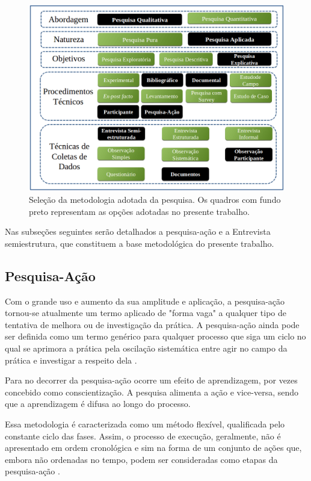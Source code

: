 \begin{figure}[!htb]
	\centering
	\includegraphics[scale=0.5]{figuras/Metodologia}
	\caption{Seleção da metodologia adotada da pesquisa. Os quadros com fundo preto representam as opções adotadas no presente trabalho.}
	\label{metodologia_adotada}
\end{figure}

Nas subseções seguintes serão detalhados a pesquisa-ação e a Entrevista semiestrutura, que constituem a base metodológica do presente trabalho.

\subsection{Pesquisa-Ação}

Com o grande uso e aumento da sua amplitude e aplicação, a pesquisa-ação tornou-se atualmente um termo aplicado de "forma vaga" a qualquer tipo de tentativa de melhora ou de investigação da prática. A pesquisa-ação ainda pode ser definida como um termo genérico para qualquer processo que siga um ciclo no qual se aprimora a prática pela oscilação sistemática entre agir no campo da prática e investigar a respeito dela \cite{tripp2005pesquisa}.

Para  no decorrer da pesquisa-ação ocorre um efeito de aprendizagem, por vezes concebido como conscientização. A pesquisa alimenta a ação e vice-versa, sendo que a aprendizagem é difusa ao longo do processo.

Essa metodologia é caracterizada como um método flexível, qualificada pelo constante ciclo das fases. Assim, o processo de execução, geralmente, não é apresentado em ordem cronológica e sim na forma de um conjunto de ações que, embora não ordenadas no tempo, podem ser consideradas como etapas da pesquisa-ação \cite{gil2002,thiollent2011metodologia}.


